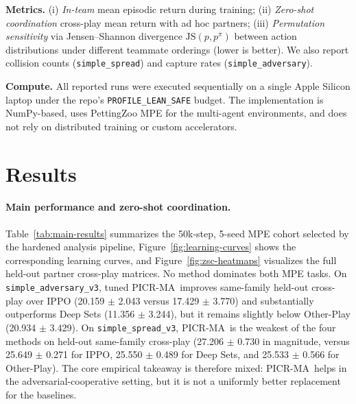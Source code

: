 \documentclass[nohyperref]{article}
\newcommand{\method}{PICR-MA} %
\newcommand{\JS}{\mathrm{JS}}
\begin{document}
\textbf{Metrics.} (i) \emph{In-team} mean episodic return during training; (ii) \emph{Zero-shot coordination} cross-play mean return with ad hoc partners; (iii) \emph{Permutation sensitivity} via Jensen--Shannon divergence $\JS(p, p^{\pi})$ between action distributions under different teammate orderings (lower is better). We also report collision counts (\texttt{simple\_spread}) and capture rates (\texttt{simple\_adversary}).

\textbf{Compute.} All reported runs were executed sequentially on a single Apple Silicon laptop under the repo's \texttt{PROFILE\_LEAN\_SAFE} budget. The implementation is NumPy-based, uses PettingZoo MPE for the multi-agent environments, and does not rely on distributed training or custom accelerators.


\section{Results}
\label{sec:results}
\paragraph{Main performance and zero-shot coordination.}
Table~\ref{tab:main-results} summarizes the 50k-step, 5-seed MPE cohort selected by the hardened analysis pipeline, Figure~\ref{fig:learning-curves} shows the corresponding learning curves, and Figure~\ref{fig:zsc-heatmaps} visualizes the full held-out partner cross-play matrices. No method dominates both MPE tasks. On \texttt{simple\_adversary\_v3}, tuned \method\ improves same-family held-out cross-play over IPPO (20.159 $\pm$ 2.043 versus 17.429 $\pm$ 3.770) and substantially outperforms Deep Sets (11.356 $\pm$ 3.244), but it remains slightly below Other-Play (20.934 $\pm$ 3.429). On \texttt{simple\_spread\_v3}, \method\ is the weakest of the four methods on held-out same-family cross-play (27.206 $\pm$ 0.730 in magnitude, versus 25.649 $\pm$ 0.271 for IPPO, 25.550 $\pm$ 0.489 for Deep Sets, and 25.533 $\pm$ 0.566 for Other-Play). The core empirical takeaway is therefore mixed: \method\ helps in the adversarial-cooperative setting, but it is not a uniformly better replacement for the baselines.

\begin{table}[t]
\centering
\caption{Main performance summary from grounded run artifacts. Lower permutation sensitivity is better. Cross-play entries remain blank when a held-out partner pool was not yet available for that environment/method.}
\label{tab:main-results}

\end{table}
\end{document}
